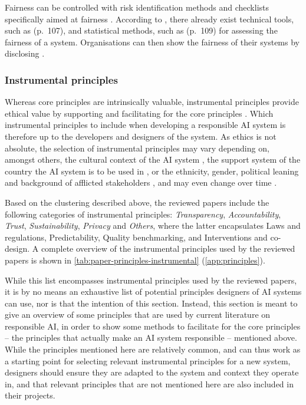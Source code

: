 Fairness can be controlled with risk identification methods and checklists specifically aimed at fairness \parencite[p.~103]{Lu_2022}. According to \textcite{Lu_2022}, there already exist technical tools, such as  (p.~107), and statistical methods, such as  (p.~109) for assessing the fairness of a system. Organisations can then show the fairness of their systems by disclosing  \parencite[p.~365]{Hacker_2022}.


\subsubsection{Instrumental principles}
\label{sec:results-principles-instrumental}
Whereas core principles are intrinsically valuable, instrumental principles provide ethical value by supporting and facilitating for the core principles \parencite{Canca_2020}. Which instrumental principles to include when developing a responsible AI system is therefore up to the developers and designers of the system. As ethics is not absolute, the selection of instrumental principles may vary depending on, amongst others, the cultural context of the AI system \parencite{vanBruxvoort_2021}, the support system of the country the AI system is to be used in \parencite{Wright_2018}, or the ethnicity, gender, political leaning and background of afflicted stakeholders \parencite{Jakesch_2022}, and may even change over time \parencite{vanBruxvoort_2021}.

Based on the clustering described above, the reviewed papers include the following categories of instrumental principles: \textit{Transparency}, \textit{Accountability}, \textit{Trust}, \textit{Sustainability}, \textit{Privacy} and \textit{Others}, where the latter encapsulates Laws and regulations, Predictability, Quality benchmarking, and Interventions and co-design. A complete overview of the instrumental principles used by the reviewed papers is shown in \autoref{tab:paper-principles-instrumental} (\autoref{app:principles}).

While this list encompasses instrumental principles used by the reviewed papers, it is by no means an exhaustive list of potential principles designers of AI systems can use, nor is that the intention of this section. Instead, this section is meant to give an overview of some principles that are used by current literature on responsible AI, in order to show some methods to facilitate for the core principles -- the principles that actually make an AI system responsible -- mentioned above. While the principles mentioned here are relatively common, and can thus work as a starting point for selecting relevant instrumental principles for a new system, designers should ensure they are adapted to the system and context they operate in, and that relevant principles that are not mentioned here are also included in their projects.


